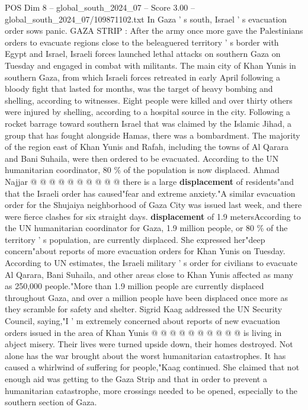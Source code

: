 \begin{textsample}{POS Dim 8 – global\_south\_2024\_07 – Score 3.00 – global\_south\_2024\_07/109871102.txt}  \label{ex:f8_pos_336}
In Gaza ' s south, Israel ' s evacuation order sows panic.
GAZA STRIP : After the army once more gave the Palestinians orders to evacuate regions close to the beleaguered territory ' s border with Egypt and Israel, Israeli forces launched lethal attacks on southern Gaza on Tuesday and engaged in combat with militants.
The main city of Khan Yunis in southern Gaza, from which Israeli forces retreated in early April following a bloody fight that lasted for months, was the target of heavy bombing and shelling, according to witnesses.
Eight people were killed and over thirty others were injured by shelling, according to a hospital source in the city.
Following a rocket barrage toward southern Israel that was claimed by the Islamic Jihad, a group that has fought alongside Hamas, there was a bombardment.
The majority of the region east of Khan Yunis and Rafah, including the towns of Al Qarara and Bani Suhaila, were then ordered to be evacuated.
According to the UN humanitarian coordinator, 80 \% of the population is now displaced.
Ahmad Najjar @ @ @ @ @ @ @ @ @ @ there is a large \textbf{displacement} of residents"and that the Israeli order has caused"fear and extreme anxiety."A similar evacuation order for the Shujaiya neighborhood of Gaza City was issued last week, and there were fierce clashes for six straight days. \textbf{displacement} of 1.9 metersAccording to the UN humanitarian coordinator for Gaza, 1.9 million people, or 80 \% of the territory ' s population, are currently displaced.
She expressed her"deep concern"about reports of more evacuation orders for Khan Yunis on Tuesday.
According to UN estimates, the Israeli military ' s order for civilians to evacuate Al Qarara, Bani Suhaila, and other areas close to Khan Yunis affected as many as 250,000 people."More than 1.9 million people are currently displaced throughout Gaza, and over a million people have been displaced once more as they scramble for safety and shelter.
Sigrid Kaag addressed the UN Security Council, saying,"I ' m extremely concerned about reports of new evacuation orders issued in the area of Khan Yunis @ @ @ @ @ @ @ @ @ @ is living in abject misery.
Their lives were turned upside down, their homes destroyed.
Not alone has the war brought about the worst humanitarian catastrophes.
It has caused a whirlwind of suffering for people,"Kaag continued.
She claimed that not enough aid was getting to the Gaza Strip and that in order to prevent a humanitarian catastrophe, more crossings needed to be opened, especially to the southern section of Gaza.

\end{textsample}
